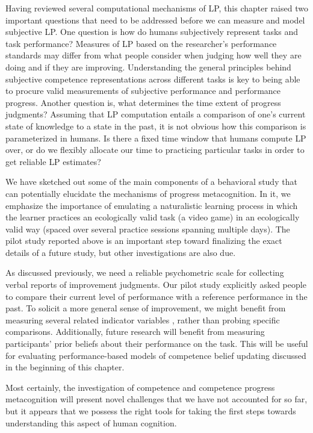 Having reviewed several computational mechanisms of \ac{LP}, this chapter raised two important questions that need to be addressed before we can measure and model subjective \ac{LP}. One question is how do humans subjectively represent tasks and task performance? Measures of \ac{LP} based on the researcher's performance standards may differ from what people consider when judging how well they are doing and if they are improving. Understanding the general principles behind subjective competence representations across different tasks is key to being able to procure valid measurements of subjective performance and performance progress. Another question is, what determines the time extent of progress judgments? Assuming that \ac{LP} computation entails a comparison of one's current state of knowledge to a state in the past, it is not obvious how this comparison is parameterized in humans. Is there a fixed time window that humans compute \ac{LP} over, or do we flexibly allocate our time to practicing particular tasks in order to get reliable \ac{LP} estimates?

We have sketched out some of the main components of a behavioral study that can potentially elucidate the mechanisms of progress metacognition. In it, we emphasize the importance of emulating a naturalistic learning process in which the learner practices an ecologically valid task (a video game) in an ecologically valid way (spaced over several practice sessions spanning multiple days). The pilot study reported above is an important step toward finalizing the exact details of a future study, but other investigations are also due.

As discussed previously, we need a reliable psychometric scale for collecting verbal reports of improvement judgments. Our pilot study explicitly asked people to compare their current level of performance with a reference performance in the past. To solicit a more general sense of improvement, we might benefit from measuring several related indicator variables \parencite{fullmer_psychometrics_2020}, rather than probing specific comparisons. Additionally, future research will benefit from measuring participants' prior beliefs about their performance on the task. This will be useful for evaluating performance-based models of competence belief updating discussed in the beginning of this chapter. 

Most certainly, the investigation of competence and competence progress metacognition will present novel challenges that we have not accounted for so far, but it appears that we possess the right tools for taking the first steps towards understanding this aspect of human cognition.